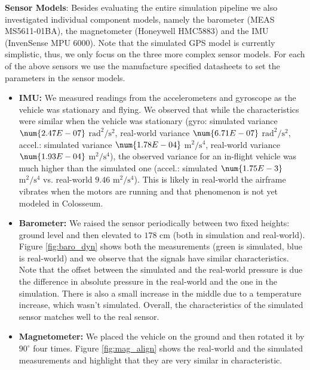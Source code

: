 \documentclass[graybox]{svmult}
\begin{document}
	\vspace{0.075in}
	\noindent \textbf{Sensor Models}: Besides evaluating the entire simulation pipeline we also investigated individual component models, namely the barometer (MEAS MS5611-01BA), the magnetometer (Honeywell HMC5883) and the IMU (InvenSense MPU 6000). Note that the simulated GPS model is currently simplistic, thus, we only focus on the three more complex sensor models. For each of the above sensors we use the manufacture specified datasheets to set the parameters in the sensor models. 
	
	\begin{itemize}
		\item {{\bf IMU:} We measured readings from the accelerometers and gyroscope as the vehicle was stationary and flying. We observed that while the characteristics were similar when the vehicle was stationary (gyro: simulated variance $\num{2.47E-07}$ $\mathrm{rad^2/s^2}$, real-world variance $\num{6.71E-07}$ $\mathrm{rad^2/s^2}$, accel.: simulated variance $\num{1.78E-04} $ $\mathrm{m^2/s^4}$, real-world variance $\num{1.93E-04}$ $\mathrm{m^2/s^4}$), the observed variance for an in-flight vehicle was much higher than the simulated one (accel.: simulated $\num{1.75E-3}$ $\mathrm{m^2/s^4}$ vs. real-world $\num{9.46}$ $\mathrm{m^2/s^4}$). This is likely in real-world the airframe vibrates when the motors are running and that phenomenon is not yet modeled in Colosseum.}
		
		\item{{\bf Barometer:} We raised the sensor periodically between two fixed heights: ground level and then elevated to $178$ cm (both in simulation and real-world). Figure \ref{fig:baro_dyn} shows both the measurements (green is simulated, blue is real-world) and we observe that the signals have similar characteristics. Note that the offset between the simulated and the real-world pressure is due the difference in absolute pressure in the real-world and the one in the simulation. There is also a small increase in the middle due to a temperature increase, which wasn't simulated. Overall, the characteristics of the simulated sensor matches well to the real sensor.}
		
		\item{{\bf Magnetometer:} We placed the vehicle on the ground and then rotated it by $90^{\circ}$ four times. Figure \ref{fig:mag_align} shows the real-world and the simulated measurements and highlight that they are very similar in characteristic.}
	\end{itemize}
	
\end{document}
